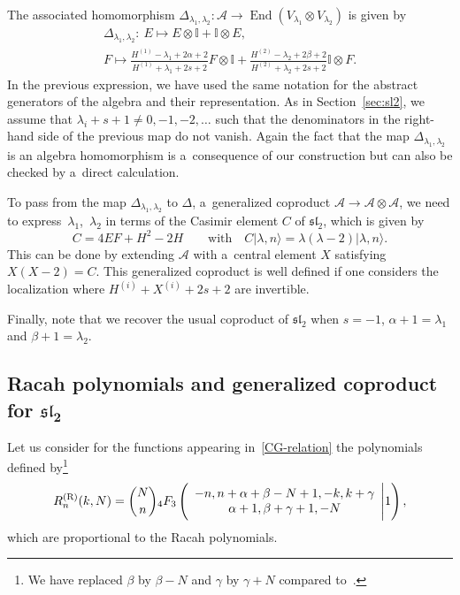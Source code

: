 \documentclass[10pt,a4paper]{amsart}
\numberwithin{equation}{section}
\theoremstyle{definition}
\begin{document}
The associated homomorphism $\Delta_{\lambda_1,\lambda_2}\colon\mathcal{A} \to \operatorname{End}(V_{\lambda_1}\otimes V_{\lambda_2})$ is given by
\begin{gather*}
 \Delta_{\lambda_1,\lambda_2} \colon\ E\mapsto E\otimes \mathbb{I}+\mathbb{I}\otimes E,\\
 F\mapsto \frac{H^{(1)}-\lambda_1+2\alpha+2}{H^{(1)}+\lambda_1+2s+2}F\otimes \mathbb{I}+\frac{H^{(2)}-\lambda_2+2\beta+2}{H^{(2)}+\lambda_2+2s+2} \mathbb{I}\otimes F.
\end{gather*}
In the previous expression, we have used the same notation for the abstract generators of the algebra and their representation.
As in Section~\ref{sec:sl2}, we assume that $\lambda_i+s+1\neq0,-1,-2,\dots $ such that the denominators in the right-hand side of the previous map do not vanish. Again the fact that the map $\Delta_{\lambda_1,\lambda_2}$ is an algebra homomorphism is a~consequence of our construction but can also be checked by a~direct calculation.

To pass from the map $\Delta_{\lambda_1,\lambda_2}$ to $\Delta$, a~generalized coproduct $\mathcal{A}\to \mathcal{A}\otimes\mathcal{A}$, we need to express~$\lambda_1$,~$\lambda_2$ in terms of the Casimir element $C$ of $\mathfrak{sl}_2$, which is given by
\begin{equation}\label{eq:Cassl2}
 C=4EF+H^2-2H \qquad \text{with} \quad C|\lambda,n\rangle=\lambda(\lambda-2)|\lambda,n\rangle .
\end{equation}
This can be done by extending $\mathcal{A}$ with a~central element $X$ satisfying $X(X-2)=C$. This generalized coproduct is well defined if one considers the localization where $H^{(i)}+X^{(i)}+2s+2$ are invertible.

Finally, note that we recover the usual coproduct of $\mathfrak{sl}_2$ when $s=-1$, $\alpha+1=\lambda_1$ and $\beta+1=\lambda_2$.

\subsection[Racah polynomials and generalized coproduct for sl\_2]{Racah polynomials and generalized coproduct for $\boldsymbol{\mathfrak{sl}_2}$}\label{ssec:Racah}

Let us consider for the functions appearing in~\eqref{CG-relation} the polynomials defined by\footnote{We have replaced $\beta$ by $\beta-N$ and $\gamma$ by $\gamma+N$ compared to~\cite{contiguity}.}
\[R^{\rm (R)}_n(k,N)=\binom{N}{n}{}_4F_3\left(\begin{array}{c} -n, n+\alpha+\beta-N+1, -k, k+\gamma \\ \alpha+1, \beta+\gamma+1, -N\end{array}\Bigg\vert 1\right),\]
which are proportional to the Racah polynomials.
\end{document}
